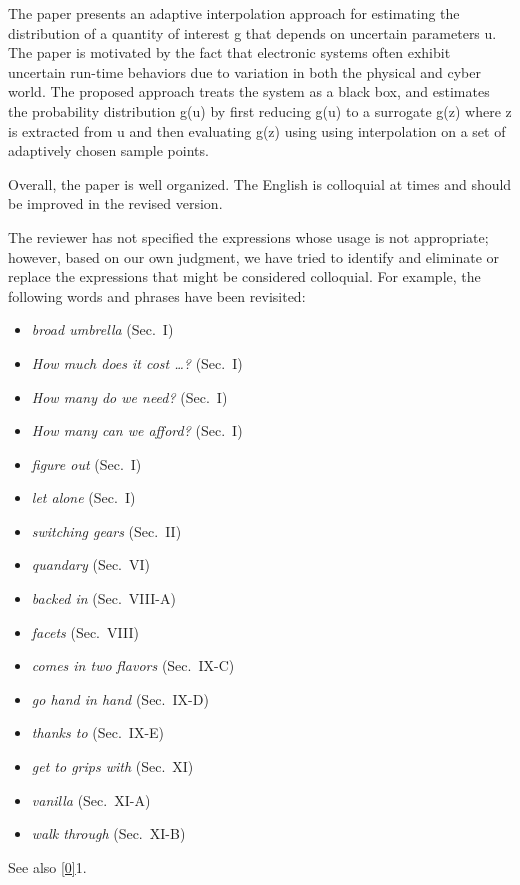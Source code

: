 \begin{reviewer}
The paper presents an adaptive interpolation approach for estimating the
distribution of a quantity of interest g that depends on uncertain parameters u.
The paper is motivated by the fact that electronic systems often  exhibit
uncertain run-time behaviors due to variation in both the physical and cyber
world. The proposed approach treats the system as a black box, and estimates the
probability distribution g(u) by first reducing g(u) to a surrogate g(z) where z
is extracted from u and then evaluating g(z) using using interpolation on a set
of adaptively chosen sample points.

Overall, the paper is well organized. The English is colloquial at times and
should be improved in the revised version.
\end{reviewer}

\begin{authors}
The reviewer has not specified the expressions whose usage is not appropriate;
however, based on our own judgment, we have tried to identify and eliminate or
replace the expressions that might be considered colloquial. For example, the
following words and phrases have been revisited:

\begin{itemize}
  \item \emph{broad umbrella} (Sec.~I)
  \item \emph{How much does it cost \dots?} (Sec.~I)
  \item \emph{How many do we need?} (Sec.~I)
  \item \emph{How many can we afford?} (Sec.~I)
  \item \emph{figure out} (Sec.~I)
  \item \emph{let alone} (Sec.~I)
  \item \emph{switching gears} (Sec.~II)
  \item \emph{quandary} (Sec.~VI)
  \item \emph{backed in} (Sec.~VIII-A)
  \item \emph{facets} (Sec.~VIII)
  \item \emph{comes in two flavors} (Sec.~IX-C)
  \item \emph{go hand in hand} (Sec.~IX-D)
  \item \emph{thanks to} (Sec.~IX-E)
  \item \emph{get to grips with} (Sec.~XI)
  \item \emph{vanilla} (Sec.~XI-A)
  \item \emph{walk through} (Sec.~XI-B)
\end{itemize}

See also \cref{0}{1}.

\begin{actions}
\end{actions}
\end{authors}

